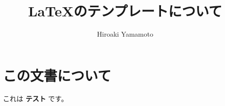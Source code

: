\documentclass[a4paper]{article}
\author{Hiroaki Yamamoto}
\title{\LaTeX のテンプレートについて}
\begin{document}
  \nocite{*}
  \cfoot{\thepage}
  \maketitle

\begin{sloppypar}
  \section{この文書について}
    これは {\bf テスト} です。
    \lipsum
\end{sloppypar}



\end{document}
